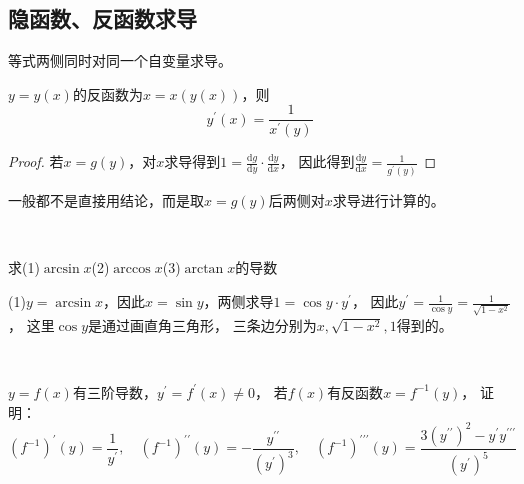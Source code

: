 \subsection{隐函数、反函数求导}

\begin{theorem}[隐函数求导]
  等式两侧同时对同一个自变量求导。
\end{theorem}

\begin{theorem}[反函数求导]
  $y = y(x)$的反函数为$x = x(y(x))$，则
  \begin{equation*}
    y^{\prime}(x) = \frac{1}{x^{\prime}(y)}
  \end{equation*}
\end{theorem}

\begin{proof}
  若$x = g(y)$，对$x$求导得到$1 = \frac{\mathrm{d} g}{\mathrm{d} y} \cdot \frac{\mathrm{d} y}{\mathrm{d} x}$，
  因此得到$\frac{\mathrm{d} y}{\mathrm{d} x} = \frac{1}{g^{\prime}(y)}$
\end{proof}

\begin{note}
  一般都不是直接用结论，而是取$x = g(y)$后两侧对$x$求导进行计算的。
\end{note}

~

\begin{exercise}[具体反函数求导练习]
  求(1)$\arcsin x$(2)$\arccos x$(3)$\arctan x$的导数
\end{exercise}

\begin{solution}
  (1)$y = \arcsin x$，因此$x = \sin y$，两侧求导$1 = \cos y \cdot y^{\prime}$，
  因此$y^{\prime} = \frac{1}{\cos y} = \frac{1}{\sqrt{1 - x^2}}$，
  这里$\cos y$是通过画直角三角形，
  三条边分别为$x,\sqrt{1 -x^2},1$得到的。
\end{solution}

~

\begin{exercise}[反函数高阶求导]
  $y = f(x)$有三阶导数，$y^{\prime} = f^{\prime}(x) \neq 0$，
  若$f(x)$有反函数$x = f^{-1}(y)$，
  证明：
  \begin{equation*}
    (f^{-1})^{\prime}(y) = \frac{1}{y^{\prime}},\quad (f^{-1})^{\prime\prime}(y) = - \frac{y^{\prime\prime}}{(y^{\prime})^3},\quad (f^{-1})^{\prime\prime\prime}(y) = \frac{3(y^{\prime\prime})^2 - y^{\prime}y^{\prime\prime\prime}}{(y^{\prime})^5}
  \end{equation*}
\end{exercise}

